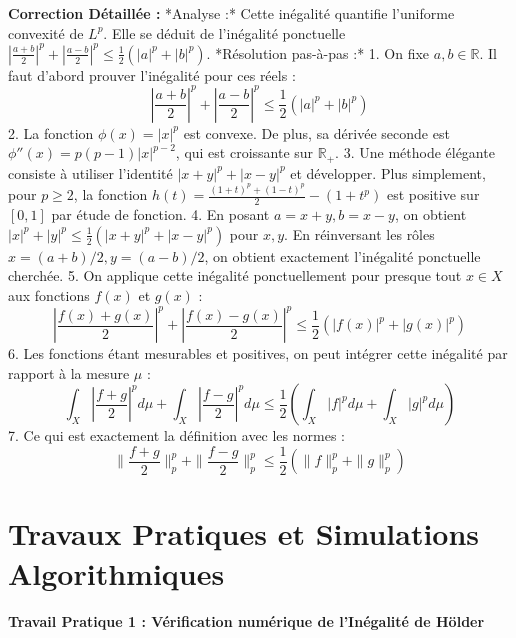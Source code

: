 \documentclass[11pt,a4paper]{article}
\begin{document}
\textbf{Correction Détaillée :}
*Analyse :* Cette inégalité quantifie l'uniforme convexité de $L^p$. Elle se déduit de l'inégalité ponctuelle $\left|\frac{a+b}{2}\right|^p + \left|\frac{a-b}{2}\right|^p \le \frac{1}{2}(|a|^p + |b|^p)$.
*Résolution pas-à-pas :*
1. On fixe $a, b \in \mathbb{R}$. Il faut d'abord prouver l'inégalité pour ces réels :
   $$\left|\frac{a+b}{2}\right|^p + \left|\frac{a-b}{2}\right|^p \le \frac{1}{2}(|a|^p + |b|^p)$$
2. La fonction $\phi(x) = |x|^p$ est convexe. De plus, sa dérivée seconde est $\phi''(x) = p(p-1)|x|^{p-2}$, qui est croissante sur $\mathbb{R}_+$.
3. Une méthode élégante consiste à utiliser l'identité $|x+y|^p + |x-y|^p$ et développer. Plus simplement, pour $p \ge 2$, la fonction $h(t) = \frac{(1+t)^p + (1-t)^p}{2} - (1+t^p)$ est positive sur $[0,1]$ par étude de fonction.
4. En posant $a = x+y, b = x-y$, on obtient $|x|^p + |y|^p \le \frac{1}{2}(|x+y|^p + |x-y|^p)$ pour $x, y$. En réinversant les rôles $x=(a+b)/2, y=(a-b)/2$, on obtient exactement l'inégalité ponctuelle cherchée.
5. On applique cette inégalité ponctuellement pour presque tout $x \in X$ aux fonctions $f(x)$ et $g(x)$ :
   $$\left|\frac{f(x)+g(x)}{2}\right|^p + \left|\frac{f(x)-g(x)}{2}\right|^p \le \frac{1}{2}(|f(x)|^p + |g(x)|^p)$$
6. Les fonctions étant mesurables et positives, on peut intégrer cette inégalité par rapport à la mesure $\mu$ :
   $$\int_X \left|\frac{f+g}{2}\right|^p d\mu + \int_X \left|\frac{f-g}{2}\right|^p d\mu \le \frac{1}{2} \left(\int_X |f|^p d\mu + \int_X |g|^p d\mu \right)$$
7. Ce qui est exactement la définition avec les normes :
   $$\|\frac{f+g}{2}\|_p^p + \|\frac{f-g}{2}\|_p^p \le \frac{1}{2}(\|f\|_p^p + \|g\|_p^p)$$


\newpage
\part{Travaux Pratiques et Simulations Algorithmiques}
\subsection*{Travail Pratique 1 : Vérification numérique de l'Inégalité de Hölder}
\end{document}
